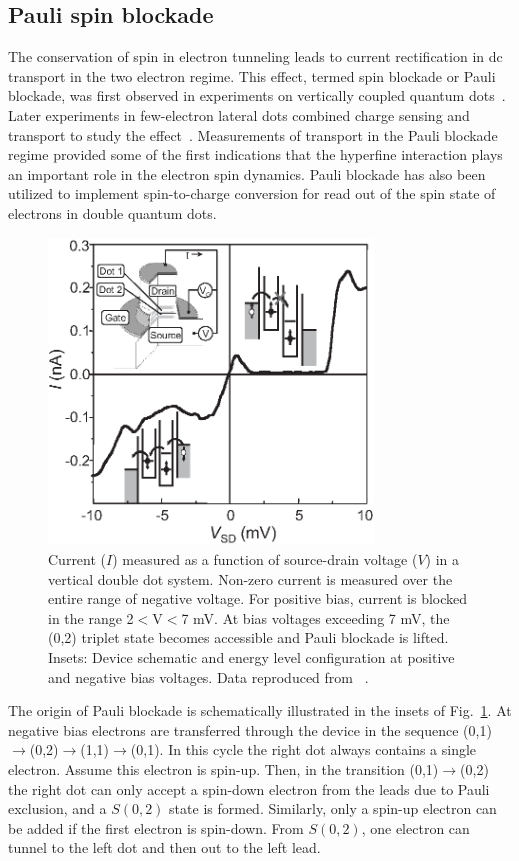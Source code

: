 \documentclass[rmp,twocolumn,aps]{revtex4}
\begin{document}
\subsection{Pauli spin blockade}
\label{Sec:PauliBlockade}
The conservation of spin in electron tunneling leads to current
rectification in dc transport in the two electron regime. This
effect, termed spin blockade or Pauli blockade, was first observed
in experiments on vertically coupled quantum
dots~\cite{OnoSpinBlock}. Later experiments in few-electron
lateral dots combined charge sensing and transport to study the
effect~\cite{JohnsonSpinBlock}. Measurements of transport in the
Pauli blockade regime provided some of the first indications that
the hyperfine interaction plays an important role in the electron
spin dynamics. Pauli blockade has also been utilized to implement
spin-to-charge conversion for read out of the spin state of
electrons in double quantum dots.

\begin{figure}[hbt]
\includegraphics[width=3.4in]{hanson_fig33.eps}
\caption{Current ($I$) measured as a function of
source-drain voltage ($V$) in a vertical double dot system.
Non-zero current is measured over the entire range of negative
voltage. For positive bias, current is blocked in the range
2$<$V$<$7 mV. At bias voltages exceeding 7 mV, the (0,2) triplet
state becomes accessible and Pauli blockade is lifted. Insets:
Device schematic and energy level configuration at positive and
negative bias voltages. Data reproduced from ~\textcite{OnoSpinBlock}.}
\label{Fig:Ono1}
\end{figure}

The origin of Pauli blockade is schematically illustrated in the
insets of Fig.~\ref{Fig:Ono1}. At negative bias electrons are
transferred through the device in the sequence
(0,1)$\rightarrow$(0,2)$\rightarrow$(1,1)$\rightarrow$(0,1). In
this cycle the right dot always contains a single electron. Assume
this electron is spin-up. Then, in the transition
(0,1)$\rightarrow$(0,2) the right dot can only accept a spin-down
electron from the leads due to Pauli exclusion, and a $S(0,2)$
state is formed. Similarly, only a spin-up electron can be added
if the first electron is spin-down. From $S(0,2)$, one electron
can tunnel to the left dot and then out to the left lead.
\end{document}
